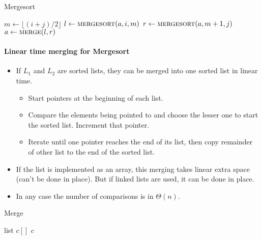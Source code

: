 \begin{algorithm}[H]
  \caption{Mergesort
    \label{alg:mergesort}}
\begin{algorithmic}[0]
\State $m \gets \lfloor (i + j)/2 \rfloor$ 
\State $l \gets \Call{mergesort}{a,i,m}$ 
\State $r \gets  \Call{mergesort}{a,m+1,j}$ 
\State $a \gets  \Call{merge}{l, r}$ 
\EndIf
\State {}
\EndFunction  
\end{algorithmic}
\end{algorithm}

\paragraph{Linear time merging for Mergesort}
\begin{itemize}
\item If $L_1$ and $L_2$ are sorted lists, they can be merged into one sorted 
list in linear time.
\begin{itemize}
\item Start pointers at the beginning of each list. 
\item Compare the elements being pointed 
to and choose the lesser one to start the sorted list. Increment that pointer. 
\item Iterate until one pointer reaches the end of its list, then 
copy remainder of other list to the end of the sorted list.
\end{itemize} 
\item If the list is implemented as an array, this merging takes linear extra 
space (can't be done in place). But if linked lists are used, it can be done in 
place.
\item In any case the number of comparisons is in $\Theta(n)$.
\end{itemize}

\begin{algorithm}[H]
  \caption{Merge}
    \label{alg:merge}
\begin{algorithmic}[0]
	\State list $c[]$
			\State \Return $c$
		\EndIf
 	\EndWhile
\EndFunction  
\end{algorithmic}
\end{algorithm}


